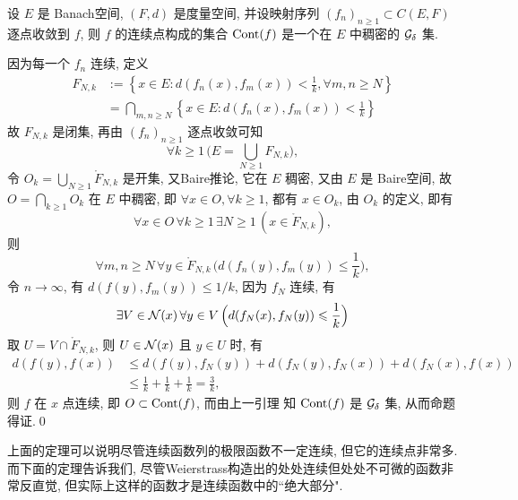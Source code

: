 	\begin{Theorem}\label{thm:连续点是Gd集}
		设 $ E $ 是 Banach空间, $ (F, d) $  是度量空间, 并设映射序列 $ (f_{n})_{n\geqslant1}\subset C(E, F) $ 逐点收敛到 $ f $, 则 $ f $ 的连续点构成的集合 $ \operatorname{Cont}(f) $ 是一个在 $ E $ 中稠密的 $ \mathcal{G}_{\delta} $ 集. 
	\end{Theorem}
	\begin{Proof}
		因为每一个 $ f_{n} $ 连续, 定义
		\[
			\begin{aligned}
				F_{N, k} & :=\left\{ x\in E: d(f_{n}(x), f_{m}(x))<\frac{1}{k}, \forall m, n\geqslant N \right\} \\
				& = \bigcap_{m,n\geqslant N}\left\{ x\in E: d(f_{n}(x), f_{m}(x))<\frac{1}{k} \right\}
			\end{aligned}
		\]
		故 $ F_{N, k} $ 是闭集, 再由 $ (f_{n})_{n\geqslant1} $ 逐点收敛可知
		\[
			\forall k\geqslant1\,\Big(E=\bigcup_{N\geqslant1}F_{N, k}\Big),
		\]
		令 $ O_{k}=\bigcup_{N\geqslant1}\mathring{F}_{N, k} $ 是开集, 又Baire推论, 它在 $ E $ 稠密, 又由 $ E $ 是 Baire空间, 故 $ O=\bigcap_{k\geqslant1}O_{k} $ 在 $ E $ 中稠密, 即 $ \forall x\in O, \forall k\geqslant1 $, 都有 $ x\in O_{k} $, 由 $ O_{k} $ 的定义, 即有
		\[
			\forall x\in O\,\forall k\geqslant1\,\exists N\geqslant1\,(x\in\mathring{F}_{N, k}),
		\]
		则
		\[
			\forall m, n\geqslant N\,\forall y\in\mathring{F}_{N, k}\,\Big(d(f_{n}(y), f_{m}(y))\leqslant\frac{1}{k}\Big),
		\]
		令 $ n\to\infty $, 有 $ d(f(y), f_{m}(y))\leqslant1/k $, 因为 $ f_{N} $ 连续, 有
		\[
			\exists V\in\mathcal{N}(x)\,\forall y\in V\,\Big( d(f_{N}(x), f_{N}(y))\leqslant\frac{1}{k} \Big)
		\]
		取 $ U = V\cap\mathring{F}_{N, k} $, 则 $ U\in\mathcal{N}(x) $ 且 $ y\in U $ 时, 有
		\[
			\begin{aligned}
				d(f(y), f(x)) & \leqslant d(f(y), f_{N}(y))+d(f_{N}(y), f_{N}(x))+d(f_{N}(x), f(x))\\
				& \leqslant \frac{1}{k}+\frac{1}{k}+\frac{1}{k}=\frac{3}{k},
			\end{aligned}
		\]
		则 $ f $ 在 $ x $ 点连续, 即 $ O\subset\operatorname{Cont}(f) $, 而由上一引理 知 $ \operatorname{Cont}(f) $ 是 $ \mathcal{G}_{\delta} $ 集, 从而命题得证.\qed
	\end{Proof}
	上面的定理可以说明尽管连续函数列的极限函数不一定连续, 但它的连续点非常多. 而下面的定理告诉我们, 尽管Weierstrass构造出的处处连续但处处不可微的函数非常反直觉, 但实际上这样的函数才是连续函数中的``绝大部分".
	
